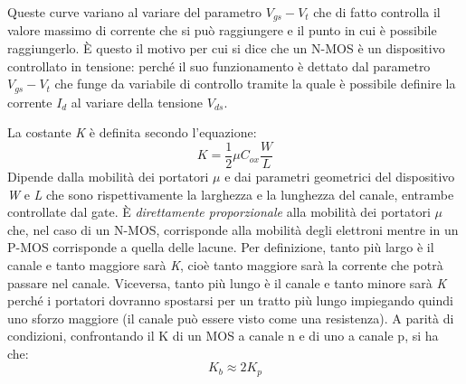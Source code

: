 \documentclass[12pt, a4paper]{report}
\begin{document}
Queste curve variano al variare del parametro $V_{gs} - V_{t}$ che di fatto controlla il valore massimo di corrente che si può raggiungere e il punto in cui è possibile raggiungerlo. È questo il motivo per cui si dice che un N-MOS è un dispositivo controllato in tensione: perché il suo funzionamento è dettato dal parametro $V_{gs} - V_{t}$ che funge da variabile di controllo tramite la quale è possibile definire la corrente $I_{d}$ al variare della tensione $V_{ds}$.

La costante \textit{K} è definita secondo l'equazione:
\begin{equation}
    K = \frac{1}{2}\mu C_{ox}\frac{W}{L}
\end{equation}
Dipende dalla mobilità dei portatori $\mu$ e dai parametri geometrici del dispositivo \textit{W} e \textit{L} che sono rispettivamente la larghezza e la lunghezza del canale, entrambe controllate dal gate.
È \textit{direttamente proporzionale} alla mobilità dei portatori $\mu$ che, nel caso di un N-MOS, corrisponde alla mobilità degli elettroni mentre in un P-MOS corrisponde a quella delle lacune.
Per definizione, tanto più largo è il canale e tanto maggiore sarà \textit{K}, cioè tanto maggiore sarà la corrente che potrà passare nel canale. Viceversa, tanto più lungo è il canale e tanto minore sarà \textit{K} perché i portatori dovranno spostarsi per un tratto più lungo impiegando quindi uno sforzo maggiore (il canale può essere visto come una resistenza). A parità di condizioni, confrontando il K di un MOS a canale n e di uno a canale p, si ha che: \begin{equation*}
    K_{b} \approx 2K_{p}
\end{equation*}
\end{document}

